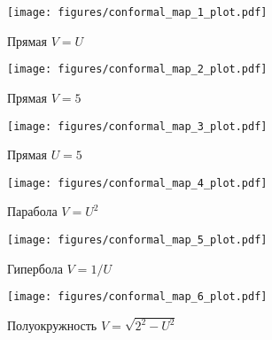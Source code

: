 \begin{frame}
	\begin{figure}
		\centering
		\texttt{[image: figures/conformal\_map\_1\_plot.pdf]}
		\caption{Прямая \(V=U\)}\label{fig:conformal_1}
	\end{figure}
\end{frame}

\begin{frame}
	\begin{figure}
		\centering
		\texttt{[image: figures/conformal\_map\_2\_plot.pdf]}
		\caption{Прямая \(V = 5\)}\label{fig:conformal_2}
	\end{figure}
\end{frame}

\begin{frame}
	\begin{figure}
		\centering
		\texttt{[image: figures/conformal\_map\_3\_plot.pdf]}
		\caption{Прямая \(U = 5\)}\label{fig:conformal_3}
	\end{figure}
\end{frame}



\begin{frame}
	\begin{figure}
		\centering
		\texttt{[image: figures/conformal\_map\_4\_plot.pdf]}
		\caption{Парабола \(V=U^2\)}\label{fig:conformal_4}
	\end{figure}
\end{frame}

\begin{frame}
	\begin{figure}
		\centering
		\texttt{[image: figures/conformal\_map\_5\_plot.pdf]}
    \caption{Гипербола \(V = 1/U\)}\label{fig:conformal_5}
	\end{figure}
\end{frame}


\begin{frame}
	\begin{figure}
		\centering
		\texttt{[image: figures/conformal\_map\_6\_plot.pdf]}
    \caption{Полуокружность \(V = \sqrt{2^2-U^2}\)}\label{fig:conformal_6}
	\end{figure}
\end{frame}
